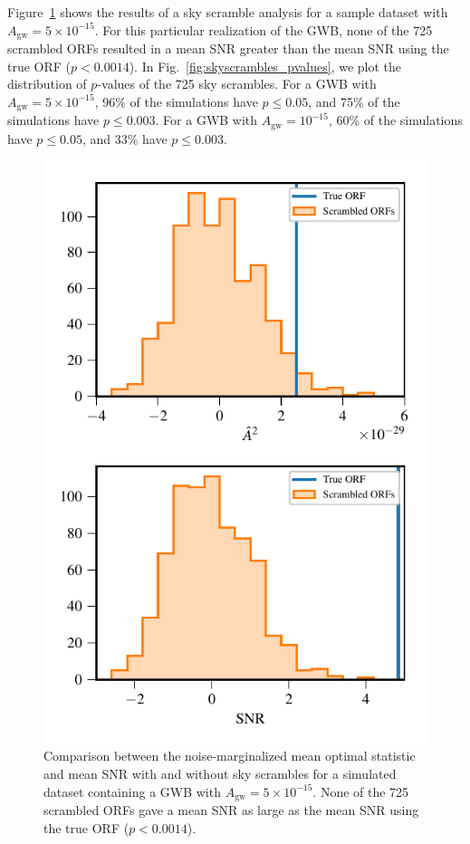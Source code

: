 \documentclass[twocolumn,aps,prd,superscriptaddress]{revtex4-1}
\newcommand{\Agw}{\ensuremath{A_\mathrm{gw}}}
\begin{document}
Figure~\ref{fig:skyscrambles_dataset_sample} shows the results of a sky scramble analysis 
for a sample dataset with $\Agw=5\times10^{-15}$. 
For this particular realization of the GWB, 
none of the 725 scrambled ORFs resulted in a mean SNR greater than 
the mean SNR using the true ORF ($p < 0.0014$).
In Fig.~\ref{fig:skyscrambles_pvalues}, we plot the distribution of $p$-values of the 725 sky scrambles. 
For a GWB with $\Agw = 5\times10^{-15}$, 96\% of the simulations have $p \leq 0.05$, 
and 75\% of the simulations have $p \leq 0.003$. 
For a GWB with $\Agw = 10^{-15}$, 60\% of the simulations have $p \leq 0.05$, 
and 33\% have $p \leq 0.003$.
\begin{figure}[tb]
	\includegraphics[width=0.9\columnwidth]{plots/optstat_scrambled_dataset11.pdf}
	\caption{Comparison between the noise-marginalized mean optimal statistic and mean SNR 
			with and without sky scrambles for a simulated dataset 
			containing a GWB with $\Agw = 5\times10^{-15}$. 
			None of the 725 scrambled ORFs gave a mean SNR as large 
			as the mean SNR using the true ORF ($p < 0.0014$).}
	\label{fig:skyscrambles_dataset_sample}
\end{figure}
\end{document}
